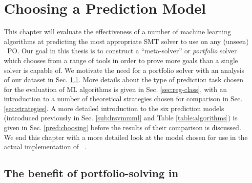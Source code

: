\chapter{Choosing a Prediction Model}
\thispagestyle{nohead}
\label{Prediction}

This chapter will evaluate the effectiveness of a number of machine learning algorithms at predicting the most appropriate SMT solver to use on any (unseen) \why~PO.
Our goal in this thesis is to construct a ``meta-solver'' or \textit{portfolio} solver which chooses from a range of tools in order to prove more goals than a single solver is capable of.
We motivate the need for a portfolio solver with an analysis of our dataset 
in Sec. \ref{sec:portfolio-benefit}. 
More details about the type of prediction task chosen for the evaluation of ML algorithms is given in Sec. \ref{sec:reg-class}, with an introduction to a number of theoretical strategies chosen for comparison in Sec. \ref{sec:strategies}. A more detailed introduction to the six prediction models (introduced previously in Sec. \ref{sub:lrsvmmml} and Table \ref{table:algorithms}) is given in Sec. \ref{pred:choosing} before the results of their comparison is discussed. We end this chapter with a more detailed look at the model chosen for use in the actual implementation of \where~.

\section{The benefit of portfolio-solving in \why}
\label{sec:portfolio-benefit}

